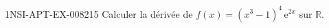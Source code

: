 \begin{exercice}{1NSI-APT-EX-008}{2}{15}
Calculer la dérivée de $f(x) = (x^3 - 1)^4 \, \mathrm{e}^{2x}$ sur $\mathbb{R}$.

\end{exercice}
